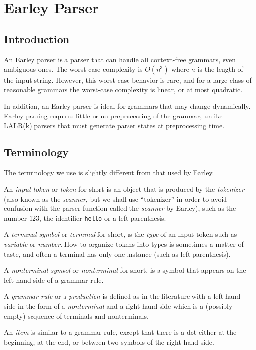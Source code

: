 \documentclass[11pt]{article}
\begin{document}
\section{Earley Parser}

\subsection{Introduction}

An Earley parser is a parser that can handle all context-free
grammars, even ambiguous ones.  The worst-case complexity is $O(n^3)$
where $n$ is the length of the input string.  However, this worst-case
behavior is rare, and for a large class of reasonable grammars the
worst-case complexity is linear, or at most quadratic.  

In addition, an Earley parser is ideal for grammars that may change
dynamically.  Earley parsing requires little or no preprocessing of
the grammar, unlike LALR(k) parsers that must generate parser states
at preprocessing time.

\subsection{Terminology}

The terminology we use is slightly different from that used by Earley.

An \emph{input token} or \emph{token} for short is an object that is
produced by the \emph{tokenizer} (also known as the \emph{scanner},
but we shall use ``tokenizer'' in order to avoid confusion with the
parser function called the \emph{scanner} by Earley), such as the
number $123$, the identifier \texttt{hello} or a left parenthesis.

A \emph{terminal symbol} or \emph{terminal} for short, is the
\emph{type} of an input token such as \emph{variable} or
\emph{number}.  How to organize tokens into types is sometimes a
matter of taste, and often a terminal has only one instance (such as
left parenthesis).  

A \emph{nonterminal symbol} or \emph{nonterminal} for short, is a
symbol that appears on the left-hand side of a grammar rule.

A \emph{grammar rule} or a \emph{production} is defined as in the
literature with a left-hand side in the form of a \emph{nonterminal}
and a right-hand side which is a (possibly empty) sequence of
terminals and nonterminals.  

An \emph{item} is similar to a grammar rule, except that there is a
dot either at the beginning, at the end, or between two symbols of the
right-hand side.
\end{document}
